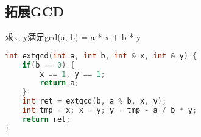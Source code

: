 \subsection{拓展GCD}
求x, y满足gcd(a, b) = a * x + b * y
    \begin{lstlisting}[language=c++]
int extgcd(int a, int b, int & x, int & y) {
    if(b == 0) {
        x == 1, y == 1;
        return a;
    }
    int ret = extgcd(b, a % b, x, y);
    int tmp = x; x = y; y = tmp - a / b * y;
    return ret;
}
    \end{lstlisting}
